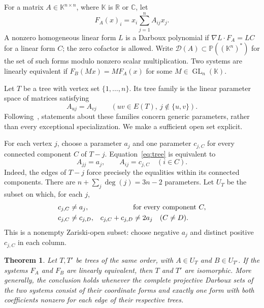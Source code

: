 \documentclass{amsart}
\newtheorem{theorem}{Theorem}
\theoremstyle{remark}
\newcommand{\PP}{\mathbb P}
\newcommand{\DD}{\mathcal D}
\numberwithin{equation}{section}
\begin{document}
For a matrix $A\in\mathbb K^{n\times n}$, where $\mathbb K$ is $\mathbb R$ or $\mathbb C$, let
\begin{equation}\label{eq:lv}
 F_A(x)_i=x_i\sum_{j=1}^n A_{ij}x_j.
\end{equation}
A nonzero homogeneous linear form $L$ is a Darboux polynomial if
$\nabla L\cdot F_A=LC$ for a linear form $C$; the zero cofactor is allowed.
Write $\DD(A)\subset\PP((\mathbb K^n)^*)$ for the set of such forms modulo nonzero scalar multiplication.
Two systems are linearly equivalent if $F_B(Mx)=MF_A(x)$ for some $M\in\operatorname{GL}_n(\mathbb K)$.

Let $T$ be a tree with vertex set $\{1,\ldots,n\}$. Its tree family is the linear parameter space of matrices satisfying
\begin{equation}\label{eq:tree}
 A_{uj}=A_{vj}\qquad(uv\in E(T),\ j\notin\{u,v\}).
\end{equation}
Following~\cite{hypergraphs}, statements about these families concern generic parameters, rather than every exceptional specialization. We make a sufficient open set explicit.

For each vertex $j$, choose a parameter $a_j$ and one parameter $c_{j,C}$ for every connected component $C$ of $T-j$. Equation~\eqref{eq:tree} is equivalent to
\begin{equation}\label{eq:columns}
 A_{jj}=a_j,\qquad A_{ij}=c_{j,C}\quad(i\in C).
\end{equation}
Indeed, the edges of $T-j$ force precisely the equalities within its connected components. There are $n+\sum_j\deg(j)=3n-2$ parameters.
Let $U_T$ be the subset on which, for each $j$,
\begin{align}\label{eq:generic}
 c_{j,C}&\ne a_j, &&\text{for every component }C,\notag\\
 c_{j,C}&\ne c_{j,D}, &
 c_{j,C}+c_{j,D}&\ne 2a_j\quad(C\ne D).
\end{align}
This is a nonempty Zariski-open subset: choose negative $a_j$ and distinct positive $c_{j,C}$ in each column.

\begin{theorem}\label{thm:main}
Let $T,T'$ be trees of the same order, with $A\in U_T$ and $B\in U_{T'}$. If the systems $F_A$ and $F_B$ are linearly equivalent, then $T$ and $T'$ are isomorphic.
More generally, the conclusion holds whenever the complete projective Darboux sets of the two systems consist of their coordinate forms and exactly one form with both coefficients nonzero for each edge of their respective trees.
\end{theorem}
\end{document}
